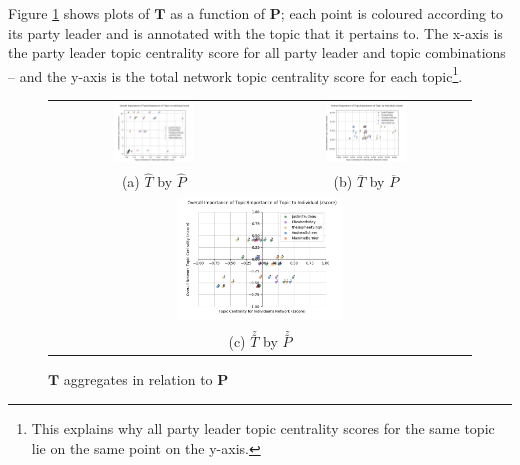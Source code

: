 Figure \ref{fig:topic_centrality} shows plots of $\textbf{T}$ as a function of
$\textbf{P}$; each point is coloured according to its party leader and is
annotated with the topic that it pertains to. The x-axis is the party leader
topic centrality score for all party leader and topic combinations -- and the
y-axis is the total network topic centrality score for each topic\footnote{This
explains why all party leader topic centrality scores for the same topic lie on
the same point on the y-axis.}.

\begin{singlespacing}
    \begin{figure}
        \centering
        \begin{tabular}{cc}
        \includegraphics[width=0.40\textwidth]{Figures/sum_opposing_centrality_chart_(expanded)} &
        \includegraphics[width=0.40\textwidth]{Figures/mean_opposing_centrality_chart_(expanded)} \\
        (a)  \textbf{$\hat{T}$} by \textbf{$\hat{P}$} & (b) \textbf{$\overline{T}$} by \textbf{$\overline{P}$} \\[6pt]
        \multicolumn{2}{c}{\includegraphics[width=0.40\textwidth]{Figures/zscore_opposing_centrality_chart_(expanded)}}\\
        \multicolumn{2}{c}{(c) \textbf{$\stackrel{z}{T}$} by \textbf{$\stackrel{z}{P}$}}
        \end{tabular}
        \caption[$\textbf{T}$ aggregates in relation to $\textbf{P}$]{$\textbf{T}$ aggregates in relation to $\textbf{P}$}
        \label{fig:topic_centrality}
    \end{figure}
\end{singlespacing}

